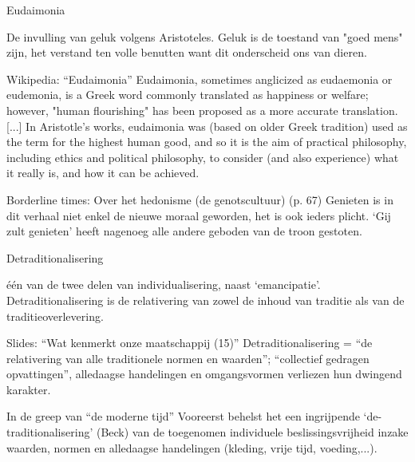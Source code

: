\documentclass[main.tex]{subfiles}
\begin{document}
\begin{examenvraag}
    \begin{vraag}
        Eudaimonia
    \end{vraag}

    \begin{antwoord}
        De invulling van geluk volgens Aristoteles.‭ ‬Geluk is de toestand van‭ "‬goed mens‭" ‬zijn,‭ ‬het verstand ten volle benutten want dit onderscheid ons van dieren.
        \begin{citaat}{Wikipedia: ``Eudaimonia''}
            Eudaimonia, sometimes anglicized as eudaemonia or eudemonia, is a Greek word commonly translated as happiness or welfare; however, "human flourishing" has been proposed as a more accurate translation.
            [...]
            In Aristotle's works, eudaimonia was (based on older Greek tradition) used as the term for the highest human good, and so it is the aim of practical philosophy, including ethics and political philosophy, to consider (and also experience) what it really is, and how it can be achieved.
        \end{citaat}
        \begin{citaat}{Borderline times: Over het hedonisme (de genotscultuur) (p. 67)}
            Genieten is in dit verhaal niet enkel de nieuwe moraal geworden, het is ook ieders plicht.
            `Gij zult genieten' heeft nagenoeg alle andere geboden van de troon gestoten.
        \end{citaat}
    \end{antwoord}
\end{examenvraag}


\begin{examenvraag}
    \begin{vraag}
        Detraditionalisering
    \end{vraag}

    \begin{antwoord}
        \'e\'en van de twee delen van individualisering, naast `emancipatie'.
        Detraditionalisering is de relativering van zowel de inhoud van traditie als van de traditieoverlevering.

        \begin{citaat}{Slides: ``Wat kenmerkt onze maatschappij (15)''}
            Detraditionalisering = “de relativering van alle traditionele normen en waarden”; “collectief gedragen opvattingen”, alledaagse handelingen en omgangsvormen verliezen hun dwingend karakter.
        \end{citaat}
        \begin{citaat}{In de greep van ``de moderne tijd''}
            Vooreerst behelst het een ingrijpende `de-traditionalisering' (Beck) van de toegenomen individuele beslissingsvrijheid inzake waarden, normen en alledaagse handelingen (kleding, vrije tijd, voeding,...).
        \end{citaat}
    \end{antwoord}
\end{examenvraag}
\end{document}
